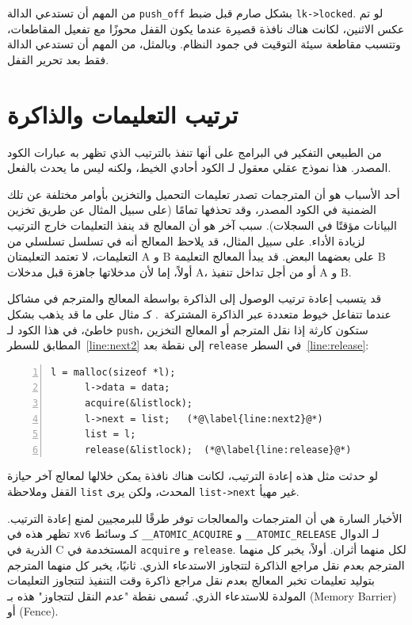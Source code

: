 من المهم أن تستدعي  الدالة \lstinline{push_off} بشكل صارم قبل ضبط \lstinline{lk->locked}.
لو تم عكس الاثنين، لكانت هناك نافذة قصيرة عندما يكون القفل محوزًا مع تفعيل المقاطعات، وتتسبب مقاطعة سيئة التوقيت في جمود النظام.
وبالمثل، من المهم أن تستدعي  الدالة  فقط بعد تحرير القفل.

\section{ترتيب التعليمات والذاكرة}
\label{SEC:MEMORDER}

من الطبيعي التفكير في البرامج على أنها تنفذ بالترتيب الذي تظهر به عبارات الكود المصدر.
هذا نموذج عقلي معقول لـ الكود أحادي الخيط، ولكنه ليس ما يحدث بالفعل.

أحد الأسباب هو أن المترجمات تصدر تعليمات التحميل والتخزين بأوامر مختلفة عن تلك الضمنية في الكود المصدر، وقد تحذفها تمامًا (على سبيل المثال عن طريق تخزين البيانات مؤقتًا في السجلات).
سبب آخر هو أن المعالج قد ينفذ التعليمات خارج الترتيب لزيادة الأداء.
على سبيل المثال، قد يلاحظ المعالج أنه في تسلسل تسلسلي من التعليمات، لا تعتمد التعليمتان A و B على بعضهما البعض.
قد يبدأ المعالج التعليمة B أولاً، إما لأن مدخلاتها جاهزة قبل مدخلات A، أو من أجل تداخل تنفيذ A و B.

قد يتسبب إعادة ترتيب الوصول إلى الذاكرة بواسطة المعالج والمترجم في مشاكل عندما تتفاعل خيوط متعددة عبر الذاكرة المشتركة~\cite{riscv:user,boehm04}.
كـ مثال على ما قد يذهب بشكل خاطئ، في هذا الكود لـ \lstinline{push}، ستكون كارثة إذا نقل المترجم أو المعالج التخزين المطابق للسطر~\ref{line:next2} إلى نقطة بعد \lstinline{release} في السطر~\ref{line:release}:
\begin{lstlisting}[numbers=left,firstnumber=1]
      l = malloc(sizeof *l);
      l->data = data;
      acquire(&listlock);
      l->next = list;   (*@\label{line:next2}@*)
      list = l;      
      release(&listlock);  (*@\label{line:release}@*)
\end{lstlisting}

لو حدثت مثل هذه إعادة الترتيب، لكانت هناك نافذة يمكن خلالها لمعالج آخر حيازة القفل وملاحظة \lstinline{list} المحدث، ولكن يرى \lstinline{list->next} غير مهيأ.

الأخبار السارة هي أن المترجمات والمعالجات توفر طرقًا للبرمجيين لمنع إعادة الترتيب.
تظهر هذه في \texttt{xv6} كـ وسائط \lstinline{__ATOMIC_ACQUIRE} و \lstinline{__ATOMIC_RELEASE} لـ الدوال الذرية في C المستخدمة في \lstinline{acquire} و \lstinline{release}.
لكل منهما أثران.
أولاً، يخبر كل منهما المترجم بعدم نقل مراجع الذاكرة لتتجاوز الاستدعاء الذري.
ثانيًا، يخبر كل منهما المترجم بتوليد تعليمات تخبر المعالج بعدم نقل مراجع ذاكرة وقت التنفيذ لتتجاوز التعليمات المولدة للاستدعاء الذري.
تُسمى نقطة "عدم النقل لتتجاوز" هذه بـ  (Memory Barrier) أو  (Fence).

